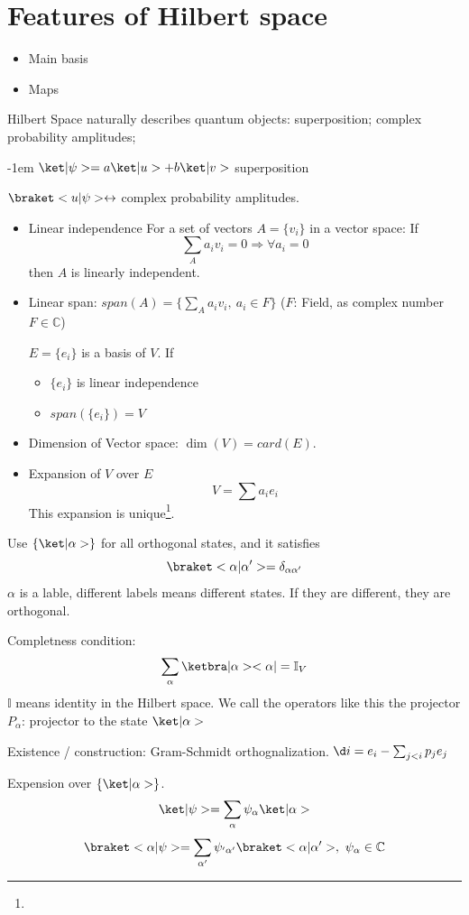 \section{Features of Hilbert space}

\begin{itemize}
  \item Main basis
  \item Maps
\end{itemize}

Hilbert Space naturally describes quantum objects: superposition; complex probability amplitudes;

 \kern-1em \textrightarrow $\ket|\psi> = a\ket|u> + b\ket|v>$ \textrightarrow superposition

 \textrightarrow $\braket<u|\psi> \leftrightarrow $ complex probability amplitudes.

\begin{definition}\leavevmode
  \begin{itemize}
    \item Linear independence
    For a set of vectors $A = \{v_i\}$ in a vector space: If
    \[\sum_A a_i v_i = 0 \Rightarrow \forall a_i = 0\]
    then $A$ is linearly independent.
    \item Linear span:
    $span(A) = \{\sum_A a_iv_i,~ a_i \in F\}$ ($F$: Field, as complex number $F \in \mathbb C$)

    $E = \{e_i\}$ is a basis of $V$. If
    \begin{itemize}
      \item $\{e_i\}$ is linear independence
      \item $span(\{e_i\}) = V$
    \end{itemize}
    \item Dimension of Vector space: $\dim(V) = card(E)$.
    \item Expansion of $V$ over $E$
    \[
      V = \sum a_i e_i
    \]
    This expansion is unique\footnote{}.
  \end{itemize}
\end{definition}

\begin{definition}
  Use $\{\ket|\alpha>\}$ for all orthogonal states, and it satisfies
  \[
    \braket<\alpha|\alpha'> = \delta_{\alpha\alpha'}
  \]
  $\alpha$ is a lable, different labels means different states. If they are different, they are orthogonal.

  Completness condition:
  \[
    \sum_\alpha \ketbra|\alpha><\alpha| = \mathbb I_V
  \]
  $\mathbb I$ means identity in the Hilbert space. We call the operators like this the projector $P_\alpha$: projector to the state $\ket|\alpha>$

  Existence / construction: Gram-Schmidt orthognalization.
  $\d i = e_i - \sum_{j < i} p_j e_j$

  Expension over $\{\ket|\alpha>\}$.
  \[
    \ket|\psi> = \sum_\alpha \psi_\alpha \ket|\alpha>
  \]
  \[
    \braket<\alpha|\psi> = \sum_{\alpha '}\psi_{'\alpha'}\braket<\alpha|\alpha'>,~
    \psi_\alpha \in \mathbb C
  \]
\end{definition}

